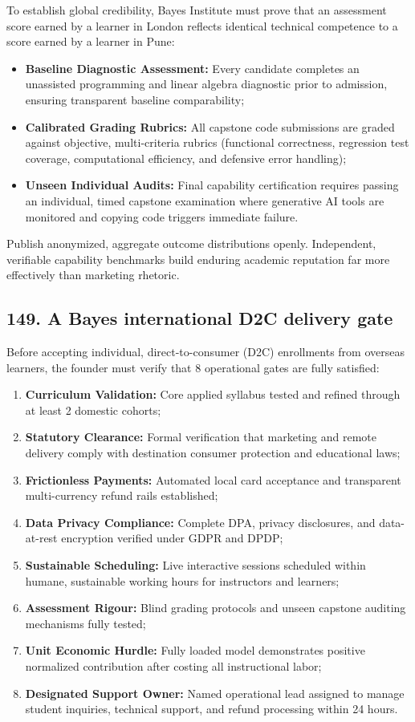 To establish global credibility, Bayes Institute must prove that an assessment score earned by a learner in London reflects identical technical competence to a score earned by a learner in Pune:
\begin{itemize}
    \item \textbf{Baseline Diagnostic Assessment:} Every candidate completes an unassisted programming and linear algebra diagnostic prior to admission, ensuring transparent baseline comparability;
    \item \textbf{Calibrated Grading Rubrics:} All capstone code submissions are graded against objective, multi-criteria rubrics (functional correctness, regression test coverage, computational efficiency, and defensive error handling);
    \item \textbf{Unseen Individual Audits:} Final capability certification requires passing an individual, timed capstone examination where generative AI tools are monitored and copying code triggers immediate failure.
\end{itemize}
Publish anonymized, aggregate outcome distributions openly. Independent, verifiable capability benchmarks build enduring academic reputation far more effectively than marketing rhetoric.

\subsection{149. A Bayes international D2C delivery gate}

Before accepting individual, direct-to-consumer (D2C) enrollments from overseas learners, the founder must verify that 8 operational gates are fully satisfied:
\begin{enumerate}
    \item \textbf{Curriculum Validation:} Core applied syllabus tested and refined through at least 2 domestic cohorts;
    \item \textbf{Statutory Clearance:} Formal verification that marketing and remote delivery comply with destination consumer protection and educational laws;
    \item \textbf{Frictionless Payments:} Automated local card acceptance and transparent multi-currency refund rails established;
    \item \textbf{Data Privacy Compliance:} Complete DPA, privacy disclosures, and data-at-rest encryption verified under GDPR and DPDP;
    \item \textbf{Sustainable Scheduling:} Live interactive sessions scheduled within humane, sustainable working hours for instructors and learners;
    \item \textbf{Assessment Rigour:} Blind grading protocols and unseen capstone auditing mechanisms fully tested;
    \item \textbf{Unit Economic Hurdle:} Fully loaded model demonstrates positive normalized contribution after costing all instructional labor;
    \item \textbf{Designated Support Owner:} Named operational lead assigned to manage student inquiries, technical support, and refund processing within 24 hours.
\end{enumerate}

